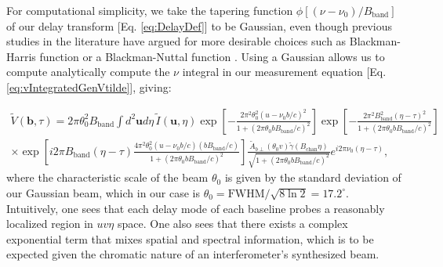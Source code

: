 \documentclass[twocolumn,aps,prd,nofootinbib,showpacs]{revtex4-1}
\begin{document}
For computational simplicity, we take the tapering function $\phi [ (\nu - \nu_0) / B_\textrm{band} ]$ of our delay transform [Eq. \eqref{eq:DelayDef}] to be Gaussian, even though previous studies in the literature have argued for more desirable choices such as Blackman-Harris function or a Blackman-Nuttal function \cite{Thyagarajan2013,Parsons2013}.  Using a Gaussian allows us to compute analytically compute the $\nu$ integral in our measurement equation [Eq. \eqref{eq:vIntegratedGenVtilde}], giving:
\begin{widetext}
\begin{eqnarray}
\widetilde{V} (\mathbf{b}, \tau) = 2 \pi \theta_0^2 B_\textrm{band} \int d^2 \mathbf{u} d\eta \, \widetilde{I} (\mathbf{u}, \eta)  \exp \left[ - \frac{2 \pi^2 \theta_0^2 \left(u - \nu_0 b / c\right)^2}{1+ \left( 2 \pi \theta_0 b B_\textrm{band}/c\right)^2}  \right] \exp \left[ - \frac{2 \pi^2 B_\textrm{band}^2 \left( \eta- \tau \right)^2}{1+ \left( 2 \pi \theta_0 b B_\textrm{band}/c\right)^2}  \right] \nonumber \\
\times \exp \left[ i 2 \pi B_\textrm{band} (\eta - \tau) \frac{4 \pi^2 \theta_0^2 \left(u - \nu_0 b / c\right)\left( b B_\textrm{band} / c\right)}{1+ \left( 2 \pi \theta_0 b B_\textrm{band}/c\right)^2}\right] \frac{ \widetilde{A}_{b\perp} (\theta_0 v) \widetilde{\gamma} (B_\textrm{chan} \eta) }{\sqrt{1+ \left( 2 \pi \theta_0 b B_\textrm{band}/c \right)^2}} e^{i 2 \pi \nu_0 (\eta - \tau)},
\end{eqnarray}
where the characteristic scale of the beam $\theta_0$ is given by the standard deviation of our Gaussian beam, which in our case is $\theta_0 = \textrm{FWHM} / \sqrt{8 \ln 2} = 17.2^\circ$.  Intuitively, one sees that each delay mode of each baseline probes a reasonably localized region in $uv\eta$ space.  One also sees that there exists a complex exponential term that mixes spatial and spectral information, which is to be expected given the chromatic nature of an interferometer's synthesized beam.


\end{widetext}
\end{document}
